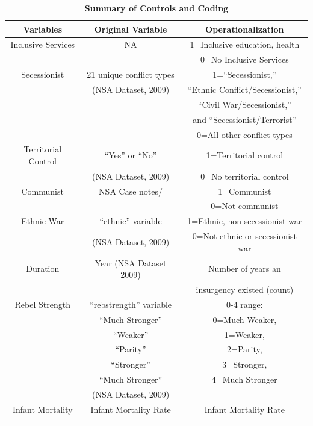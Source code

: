 \documentclass[12pt, letterpaper]{article}
\begin{document}
\begin{table}[h]
\def\sym#1{\ifmmode^{#1}\else\(^{#1}\)\fi}
\renewcommand\thetable{A.\Roman{table}}
\caption{\textbf{Summary of Controls and Coding}}
    \begin{tabular}{| c | c | c |}
    \hline
    \textbf{Variables} & \textbf{Original Variable} & \textbf{Operationalization} \\ \hline \hline
    Inclusive Services &                NA                  & 1=Inclusive education, health \\
    &  &  0=No Inclusive Services  \\ \hline
 Secessionist &  21 unique conflict types  & 1=``Secessionist,'' \\
  &   (NSA Dataset, 2009) & ``Ethnic Conflict/Secessionist,'' \\
   &   & ``Civil War/Secessionist,''   \\
    &      & and ``Secessionist/Terrorist'' \\ 
     &    & 0=All other conflict types  \\  \hline
Territorial Control &   ``Yes''   or  ``No''                & 1=Territorial control\\
      &   (NSA Dataset, 2009) &  0=No territorial control     \\
          \hline
Communist &                NSA Case notes/               & 1=Communist\\
      & \citep{kalyvas2010international} &  0=Not communist  \\ \hline
Ethnic War &       ``ethnic'' variable & 1=Ethnic, non-secessionist war \\   
 &       (NSA Dataset, 2009)          &  0=Not ethnic or secessionist war  \\       \hline     
Duration &         Year  (NSA Dataset 2009)             & Number of years an   \\  
&                    &   insurgency existed  (count)\\        \hline
Rebel Strength & ``rebstrength'' variable & 0-4 range: \\
 &  ``Much Stronger'' & 0=Much Weaker, \\
  &  ``Weaker'' & 1=Weaker, \\
   &   ``Parity'' &  2=Parity, \\
    &   ``Stronger''  & 3=Stronger, \\ 
     &  ``Much Stronger''  & 4=Much Stronger \\  
       &  (NSA Dataset, 2009) &  \\    \hline
 Infant Mortality &       Infant Mortality Rate               & Infant Mortality Rate\\      
  &        \citep{world2012}         &  \\   \hline


\end{tabular}
\end{table}
\end{document}
